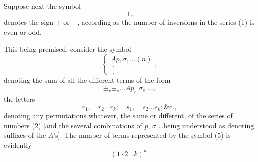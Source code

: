 \documentclass[11pt,a4paper]{article}
\theoremstyle{plain}
\theoremstyle{definition}
\theoremstyle{remark}
\begin{document}
Suppose next the symbol
\[
\pm_r
\]
denotes the sign $+$ or $-$, according as the number of inversions in the series (1) is
even or odd.

This being premised, consider the symbol
\[
\left\{\begin{array}{c}
Ap, \sigma, \ldots (n) \\
\left[\begin{array}{c}
\\
\end{array}\right.
\end{array}\right.
\tag{4},
\]
denoting the sum of all the different terms of the form
\[
\pm_r \pm_s \ldots Ap_{r_1}\sigma_{s_1} \ldots
\tag{5},
\]
the letters
\[
r_1, \quad r_2 \ldots r_k; \quad s_1, \quad s_2 \ldots s_k; \&\text{c.}
\tag{6},
\]
denoting any permutations whatever, the same or different, of the series of numbers
(2) [and the several combinations of $p$, $\sigma$ \ldots being understood as denoting suffixes of
the $A$'s]. The number of terms represented by the symbol (5) is evidently
\[
(1 \cdot 2 \ldots k)^n
\tag{7}.
\]
\end{document}
